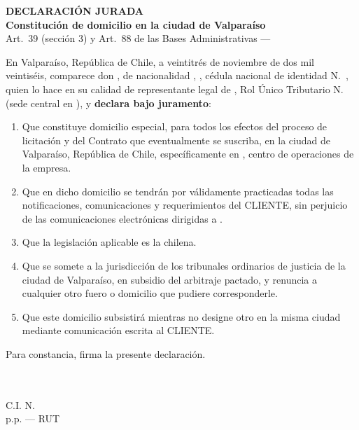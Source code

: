\documentclass[11pt]{article}
\begin{document}
\begin{center}
  {\Large\bfseries DECLARACIÓN JURADA}\\[6pt]
  {\bfseries Constitución de domicilio en la ciudad de Valparaíso}\\[4pt]
  {\small Art.~39\textdegree{} (sección 3) y Art.~88\textdegree{} de las Bases Administrativas --- \LFXlicitacion}
\end{center}

\noindent En Valparaíso, República de Chile, a veintitrés de noviembre de dos mil veintiséis, comparece don \textbf{\LFXrepresentante}, de nacionalidad \SIMnacionalidad, \SIMprofesion, cédula nacional de identidad N.\textdegree~\SIMrunrepresentante, quien lo hace en su calidad de representante legal de \textbf{\LFXempresa}, Rol Único Tributario N.\textdegree~\LFXrut{} (sede central en \SIMsedecentral), y \textbf{declara bajo juramento}:

\begin{enumerate}[label=\arabic*.,leftmargin=2em,itemsep=2pt]
  \item Que constituye domicilio especial, para todos los efectos del proceso de licitación y del Contrato que eventualmente se suscriba, en la ciudad de Valparaíso, República de Chile, específicamente en \textbf{\LFXdomicilio}, centro de operaciones de la empresa.
  \item Que en dicho domicilio se tendrán por válidamente practicadas todas las notificaciones, comunicaciones y requerimientos del CLIENTE, sin perjuicio de las comunicaciones electrónicas dirigidas a \LFXcorreo.
  \item Que la legislación aplicable es la chilena.
  \item Que se somete a la jurisdicción de los tribunales ordinarios de justicia de la ciudad de Valparaíso, en subsidio del arbitraje pactado, y renuncia a cualquier otro fuero o domicilio que pudiere corresponderle.
  \item Que este domicilio subsistirá mientras no designe otro en la misma ciudad mediante comunicación escrita al CLIENTE.
\end{enumerate}

\noindent Para constancia, firma la presente declaración.

\vspace{12pt}
\begin{center}
  \SIMfirmalinea{7cm}{0.5pt}\\
  \textbf{\LFXrepresentante}\\
  C.I. N.\textdegree~\SIMrunrepresentante\\
  p.p. \LFXempresa{} --- RUT \LFXrut
\end{center}
\end{document}
